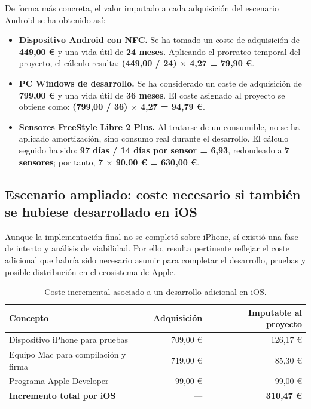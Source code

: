 De forma más concreta, el valor imputado a cada adquisición del escenario Android se ha
obtenido así:

\begin{itemize}
    \item \textbf{Dispositivo Android con NFC.} Se ha tomado un coste de adquisición de
          \textbf{449,00 \euro{}} y una vida útil de \textbf{24 meses}. Aplicando el
          prorrateo temporal del proyecto, el cálculo resulta:
          \textbf{(449,00 / 24) $\times$ 4,27 = 79,90 \euro{}}.
    \item \textbf{PC Windows de desarrollo.} Se ha considerado un coste de adquisición de
          \textbf{799,00 \euro{}} y una vida útil de \textbf{36 meses}. El coste asignado al
          proyecto se obtiene como:
          \textbf{(799,00 / 36) $\times$ 4,27 = 94,79 \euro{}}.
    \item \textbf{Sensores FreeStyle Libre 2 Plus.} Al tratarse de un consumible, no se ha
          aplicado amortización, sino consumo real durante el desarrollo. El cálculo seguido
          ha sido: \textbf{97 días / 14 días por sensor = 6,93}, redondeado a
          \textbf{7 sensores}; por tanto,
          \textbf{7 $\times$ 90,00 \euro{} = 630,00 \euro{}}.
\end{itemize}

\subsection{Escenario ampliado: coste necesario si también se hubiese desarrollado en iOS}

Aunque la implementación final no se completó sobre iPhone, sí existió una fase de intento y
análisis de viabilidad. Por ello, resulta pertinente reflejar el coste adicional que habría
sido necesario asumir para completar el desarrollo, pruebas y posible distribución en el
ecosistema de Apple.

\begin{table}[H]
    \centering
    \caption{Coste incremental asociado a un desarrollo adicional en iOS.}
    \label{tab:costes-ios}
    \begin{tabular}{|p{6.2cm}|r|r|}
        \hline
        \textbf{Concepto} & \textbf{Adquisición} & \textbf{Imputable al proyecto} \\
        \hline
        Dispositivo iPhone para pruebas & 709,00 \euro{} & 126,17 \euro{} \\
        \hline
        Equipo Mac para compilación y firma & 719,00 \euro{} & 85,30 \euro{} \\
        \hline
        Programa Apple Developer & 99,00 \euro{} & 99,00 \euro{} \\
        \hline
        \textbf{Incremento total por iOS} & --- & \textbf{310,47 \euro{}} \\
        \hline
    \end{tabular}
\end{table}

